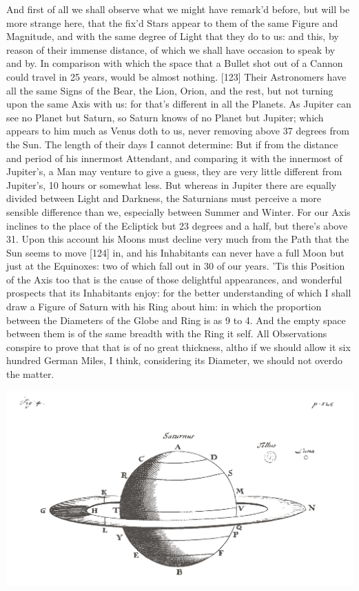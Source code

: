 \documentclass[letterpaper]{book}
\begin{document}
And first of all we shall observe what we might have remark'd before, but
will be more strange here, that the fix'd Stars appear to them of the same
Figure and Magnitude, and with the same degree of Light that they do to us:
and this, by reason of their immense distance, of which we shall have
occasion to speak by and by. In comparison with which the space that a
Bullet shot out of a Cannon could travel in 25 years, would be almost
nothing.  [123] Their Astronomers have all the same Signs of the Bear, the
Lion, Orion, and the rest, but not turning upon the same Axis with us: for
that's different in all the Planets.  As Jupiter can see no Planet but
Saturn, so Saturn knows of no Planet but Jupiter; which appears to him much
as Venus doth to us, never removing above 37 degrees from the Sun. The
length of their days I cannot determine: But if from the distance and period
of his innermost Attendant, and comparing it with the innermost of
Jupiter's, a Man may venture to give a guess, they are very little different
from Jupiter's, 10 hours or somewhat less. But whereas in Jupiter there are
equally divided between Light and Darkness, the Saturnians must perceive a
more sensible difference than we, especially between Summer and Winter. For
our Axis inclines to the place of the Ecliptick but 23 degrees and a half,
but there's above 31. Upon this account his Moons must decline very much
from the Path that the Sun seems to move [124] in, and his Inhabitants can
never have a full Moon but just at the Equinoxes: two of which fall out in
30 of our years. 'Tis this Position of the Axis too that is the cause of
those delightful appearances, and wonderful prospects that its Inhabitants
enjoy: for the better understanding of which I shall draw a Figure of Saturn
with his Ring about him: in which the proportion between the Diameters of
the Globe and Ring is as 9 to 4.  And the empty space between them is of the
same breadth with the Ring it self. All Observations conspire to prove that
that is of no great thickness, altho if we should allow it six hundred
German Miles, I think, considering its Diameter, we should not overdo the
matter.  

\begin{center}
	\includegraphics[width=.90\textwidth]{ct_4_en.jpg}
\end{center}
\end{document}
